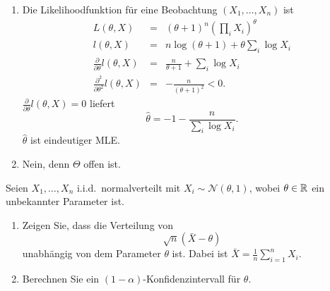 \solution
\begin{enumerate}

    \item Die Likelihoodfunktion für eine Beobachtung $(X_1,\ldots,X_n)$ ist 
        \begin{eqnarray}
            L(\theta,X) &=& \left( \theta+1 \right)^n \left( \prod_i X_i \right)^{\theta}  \\
            l(\theta,X) &=& n \log \left( \theta+1 \right)  + \theta \sum_{i}^{} \log X_i \\
            \frac{\partial}{\partial \theta} l(\theta,X)&=& \frac{n}{\theta+1} + \sum_{i}^{} \log X_i \\
            \frac{\partial^2}{\partial \theta^2} l(\theta,X) &=& 
            - \frac{n}{\left( \theta+1 \right)^2} < 0.
        \end{eqnarray}
        $\frac{\partial}{\partial \theta} l(\theta,X)=0$ liefert
        \begin{equation}
            \hat\theta = -1 - \frac{n}{\sum_{i}^{} \log X_i}.
        \end{equation}
        $\hat\theta$ ist eindeutiger MLE.

    \item Nein, denn $\Theta$ offen ist.

\end{enumerate}







Seien $X_1,\ldots,X_n$ i.i.d.\ normalverteilt mit $X_i \sim \mathcal N \left(\theta, 1 \right)$,
wobei $\theta\in\mathbb R$ ein unbekannter Parameter ist.
\begin{enumerate}
    \item Zeigen Sie, dass die Verteilung von 
        \begin{equation*}
            \sqrt{n}\left( \bar X -\theta \right)
        \end{equation*}
        unabhängig von dem Parameter $\theta$ ist. Dabei ist $\bar X = \frac{1}{n} \sum_{i=1}^{n} X_i$.
    \item Berechnen Sie ein $\left( 1-\alpha \right)$-Konfidenzintervall für $\theta$.
\end{enumerate}


